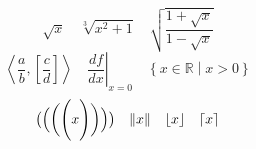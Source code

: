 \documentclass{article}
\begin{document}
\[\sqrt{x}\quad\sqrt[3]{x^2+1}\quad\sqrt{\frac{1+\sqrt{x}}{1-\sqrt{x}}}\]
\[\left\langle\frac{a}{b},\left[\frac{c}{d}\right]\right\rangle\quad\left.\frac{df}{dx}\right|_{x=0}\quad\left\{x\in\mathbb R\middle|x>0\right\}\]
\[\bigl(\Bigl(\biggl(\Biggl( x \Biggr)\biggr)\Bigr)\bigr)\quad\lVert x\rVert\quad\lfloor x\rfloor\quad\lceil x\rceil\]
\end{document}
